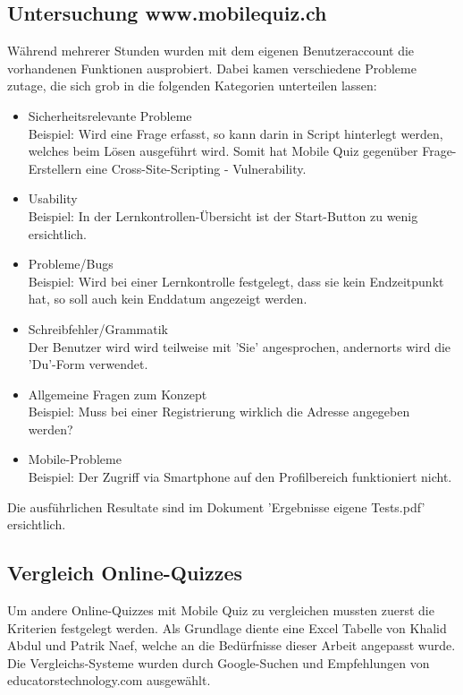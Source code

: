 	\subsection{Untersuchung www.mobilequiz.ch}
	Während mehrerer Stunden wurden mit dem eigenen Benutzeraccount die vorhandenen Funktionen ausprobiert. Dabei kamen verschiedene Probleme zutage, die sich grob in die folgenden Kategorien unterteilen lassen:
	
	
	\begin{itemize}
		\item Sicherheitsrelevante Probleme \\
		Beispiel: Wird eine Frage erfasst, so kann darin in Script hinterlegt werden, welches beim Lösen ausgeführt wird. Somit hat Mobile Quiz gegenüber Frage-Erstellern eine \gls{Cross-Site-Scripting} - \gls{Vulnerability}.
		\item Usability \\
		Beispiel: In der Lernkontrollen-Übersicht ist der Start-Button zu wenig ersichtlich.
		\item Probleme/Bugs \\
		Beispiel: Wird bei einer Lernkontrolle festgelegt, dass sie kein Endzeitpunkt hat, so soll auch kein Enddatum angezeigt werden.
		\item Schreibfehler/Grammatik \\
		Der Benutzer wird wird teilweise mit 'Sie' angesprochen, andernorts wird die 'Du'-Form verwendet.
		\item Allgemeine Fragen zum Konzept \\
		Beispiel: Muss bei einer Registrierung wirklich die Adresse angegeben werden?
		\item Mobile-Probleme \\
		Beispiel: Der Zugriff via Smartphone auf den Profilbereich funktioniert nicht.
	\end{itemize}

	Die ausführlichen Resultate sind im Dokument 'Ergebnisse eigene Tests.pdf' ersichtlich.
	

	\subsection{Vergleich Online-Quizzes}
	Um andere Online-Quizzes mit Mobile Quiz zu vergleichen mussten zuerst die Kriterien festgelegt werden. Als Grundlage diente eine Excel Tabelle von Khalid Abdul und Patrik Naef, welche an die Bedürfnisse dieser Arbeit angepasst wurde.
	Die Vergleichs-Systeme wurden durch Google-Suchen und Empfehlungen von educatorstechnology.com \cite{educatorstechnology.com} ausgewählt.
	
